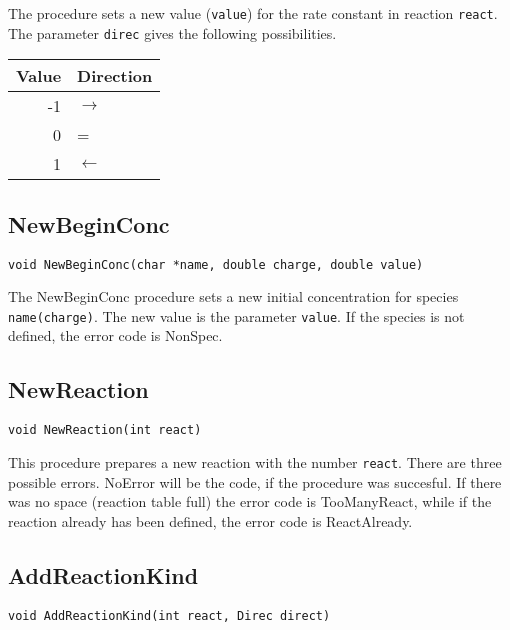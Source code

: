 The procedure sets a new value ({\tt value}) for the rate constant 
in reaction {\tt react}. The parameter {\tt direc} gives the 
following possibilities.

\vspace{.2cm}
\begin{center}
\begin{tabular}{rl}
\hline
 Value      & Direction \\ \hline 
 -1         & $\rightarrow$ \\ 
 0          & = \\ 
 1          & $\leftarrow$ \\ 
\hline
\end{tabular}
\end{center}
\vspace{.2cm}

\subsection{NewBeginConc}
\begin{verbatim}
void NewBeginConc(char *name, double charge, double value)
\end{verbatim}

The NewBeginConc procedure sets a new initial concentration for species {\tt 
name(charge)}. The new value is the parameter {\tt value}. If the 
species is not defined, the error code is NonSpec.

\subsection{NewReaction}
\begin{verbatim}
void NewReaction(int react)
\end{verbatim}

This procedure prepares a new reaction with the number {\tt react}. 
There are three possible errors.
NoError will be the code, if the procedure was succesful. If there 
was no space (reaction table full) the error code is TooManyReact, while if the
reaction already has been defined, the error code is ReactAlready.

\subsection{AddReactionKind}
\begin{verbatim}
void AddReactionKind(int react, Direc direct)
\end{verbatim}

